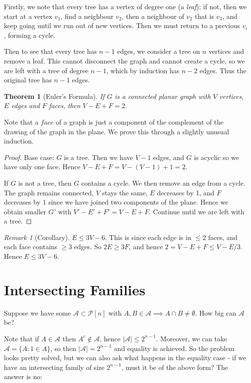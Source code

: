 \documentclass[]{article}
\theoremstyle{custhm}
\theoremstyle{cusdef}
\theoremstyle{custhm}
\theoremstyle{custhm}
\theoremstyle{custhm}
\theoremstyle{custhm}
\newtheorem*{theorem*}{Theorem}
\theoremstyle{cusdef}
\theoremstyle{remark}
\newtheorem*{remark*}{Remark}
\renewcommand{\it}[1]{\textit{#1}}
\newcommand{\A}{\mathcal{A}}
\begin{document}
Firstly, we note that every tree has a vertex of degree one (a \it{leaf}); if not, then we start at a vertex $v_1$, find a neighbour $v_2$, then a neighbour of $v_2$ that is $v_3$, and keep going until we run out of new vertices. Then we must return to a previous $v_i$, forming a cycle.

Then to see that every tree has $n-1$ edges, we consider a tree on $n$ vertices and remove a leaf. This cannot disconnect the graph and cannot create a cycle, so we are left with a tree of degree $n-1$, which by induction has $n-2$ edges. Thus the original tree has $n-1$ edges.

\begin{theorem*}[Euler's Formula]
If $G$ is a connected planar graph with $V$ vertices, $E$ edges and $F$ faces, then $V - E + F = 2$.
\end{theorem*}
Note that a $\it{face}$ of a graph is just a component of the complement of the drawing of the graph in the plane. We prove this through a slightly unusual induction.

\begin{proof}
Base case: $G$ is a tree. Then we have $V-1$ edges, and $G$ is acyclic so we have only one face. Hence $V - E + F = V - (V-1) + 1 = 2$.

If $G$ is not a tree, then $G$ contains a cycle. We then remove an edge from a cycle. The graph remains connected, $V$ stays the same, $E$ decreases by 1, and $F$ decreases by 1 since we have joined two components of the plane. Hence we obtain smaller $G'$ with $V' - E' + F' = V - E + F$. Continue until we are left with a tree.
\end{proof}

\begin{remark*}[Corollary]
$E \le 3V - 6$. This is since each edge is in $\le 2$ faces, and each face contains $\ge 3 $ edges. So $2E \ge 3F$, and hence $2 = V - E + F \le V  - E/3$. Hence $E \le 3V - 6$.
\end{remark*}


\section{Intersecting Families}

Suppose we have some $\A\subset \mathcal{P}[n]$ with $A,B\in \A\implies A\cap B \ne \emptyset$. How big can $\A$ be?

Note that if $A\in \A$ then $A^{c}\not\in \A$, hence $|\A|\le 2^{n-1}$. Moreover, we can take $\A = \{A:1\in A\}$, so then $|\A| = 2^{n-1}$ and equality is achieved. So the problem looks pretty solved, but we can also ask what happens in the equality case - if we have an intersecting family of size $2^{n-1}$, must it be of the above form? The answer is no:
\end{document}
